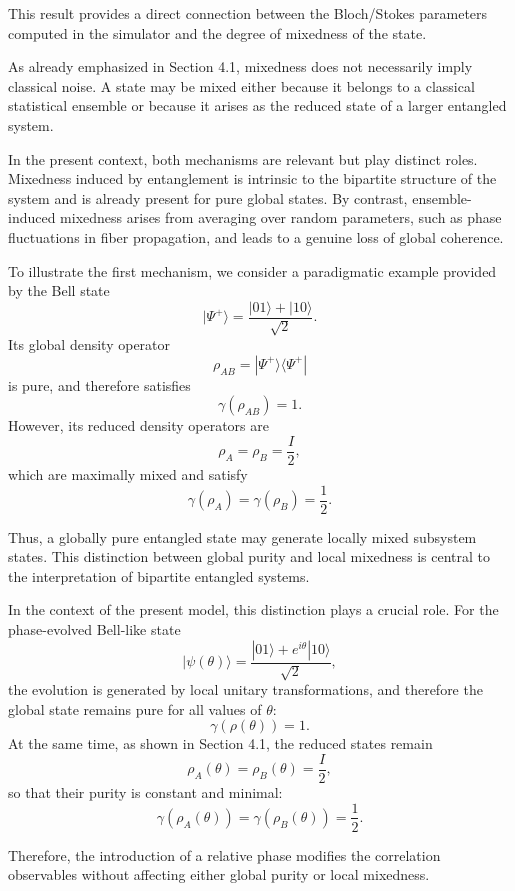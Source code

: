 \documentclass[a4paper]{article}
\begin{document}
This result provides a direct connection between the Bloch/Stokes parameters computed in the simulator and the degree of mixedness of the state.

\medskip

As already emphasized in Section 4.1, mixedness does not necessarily imply classical noise. A state
may be mixed either because it belongs to a classical statistical ensemble or because it arises as
the reduced state of a larger entangled system.

In the present context, both mechanisms are relevant but play distinct roles. Mixedness induced by
entanglement is intrinsic to the bipartite structure of the system and is already present for pure
global states. By contrast, ensemble-induced mixedness arises from averaging over random parameters,
such as phase fluctuations in fiber propagation, and leads to a genuine loss of global coherence.

To illustrate the first mechanism, we consider a paradigmatic example provided by the Bell state
\[
|\Psi^+\rangle = \frac{|01\rangle + |10\rangle}{\sqrt{2}}.
\]
Its global density operator
\[
\rho_{AB} = |\Psi^+\rangle \langle \Psi^+|
\]
is pure, and therefore satisfies
\[
\gamma(\rho_{AB}) = 1.
\]
However, its reduced density operators are
\[
\rho_A = \rho_B = \frac{I}{2},
\]
which are maximally mixed and satisfy
\[
\gamma(\rho_A) = \gamma(\rho_B) = \frac{1}{2}.
\]

Thus, a globally pure entangled state may generate locally mixed subsystem states. This distinction between global purity and local mixedness is central to the interpretation of bipartite entangled systems.

\medskip

In the context of the present model, this distinction plays a crucial role. For the phase-evolved Bell-like state
\[
|\psi(\theta)\rangle = \frac{|01\rangle + e^{i\theta}|10\rangle}{\sqrt{2}},
\]
the evolution is generated by local unitary transformations, and therefore the global state remains pure for all values of $\theta$:
\[
\gamma(\rho(\theta)) = 1.
\]
At the same time, as shown in Section 4.1, the reduced states remain
\[
\rho_A(\theta) = \rho_B(\theta) = \frac{I}{2},
\]
so that their purity is constant and minimal:
\[
\gamma(\rho_A(\theta)) = \gamma(\rho_B(\theta)) = \frac{1}{2}.
\]

Therefore, the introduction of a relative phase modifies the correlation observables without affecting either global purity or local mixedness.

\medskip
\end{document}
